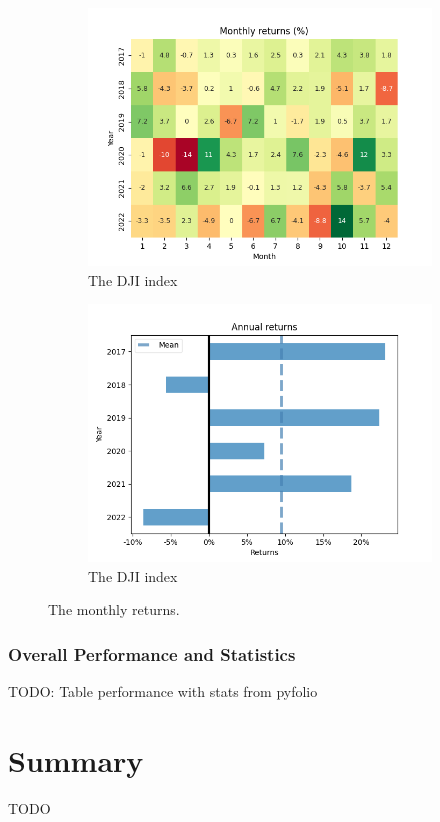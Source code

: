 \documentclass[../xlapes02]{subfiles}
\begin{document}
\begin{figure}[h!]
        \begin{subfigure}[t]{\experimentimgwidth\textwidth}
            \centering
            \label{subfig:montly_returns_heatmap_dji}
            \includegraphics[width=\linewidth]{image/figure/monthly_returns_heatmap_dji}
            \caption{The DJI index}
        \end{subfigure}
        \hfill
        \begin{subfigure}[t]{\experimentimgwidth\textwidth}
            \centering
            \label{subfig:annual_returns_dji}
            \includegraphics[width=\linewidth]{image/figure/annual_returns_dji}
            \caption{The DJI index}
        \end{subfigure}

        \caption{The monthly returns.}
        \label{fig:month_annual_returns}
    \end{figure}

    \subsubsection{Overall Performance and Statistics}
    TODO: Table performance with stats from pyfolio


    \section{Summary}\label{sec:summary}
    TODO
\end{document}
